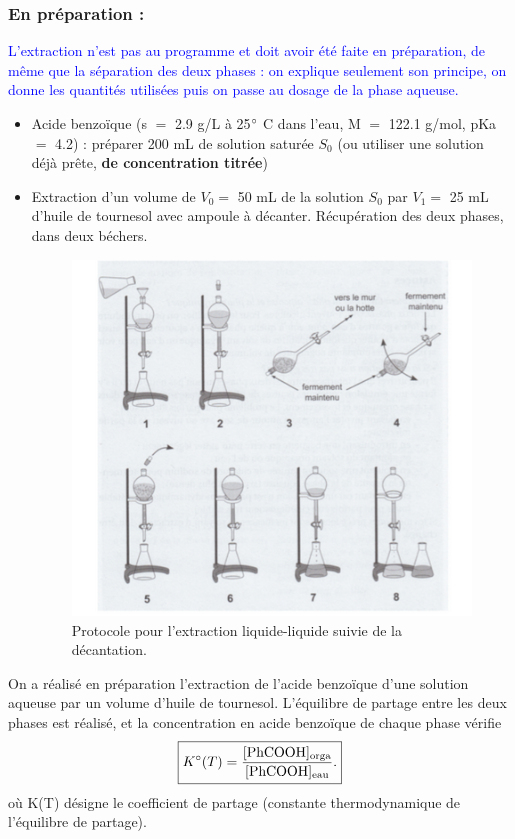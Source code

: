 \documentclass[11pt,a4paper]{report}
\begin{document}
\subsubsection{En préparation :}
\textcolor{blue}{L'extraction n'est pas au programme et doit avoir été faite en préparation, de même que la séparation des deux phases : on explique seulement son principe, on donne les quantités utilisées puis on passe au dosage de la phase aqueuse.}\\

\begin{itemize}
	\item Acide benzoïque (s $=$ 2.9 g/L à 25$\degree$ C dans l'eau, M $=$ 122.1 g/mol,
		 pKa $=$ 4.2) : préparer 200 mL de solution saturée $S_0$ (ou utiliser une solution déjà 				 prête, \textbf{de concentration titrée})
	\item Extraction d'un volume de $V_0 =$ 50 mL de la solution $S_0$ par $V_1 =$ 25 mL d'huile de 					tournesol avec ampoule à décanter. Récupération des deux phases, dans deux béchers.
	\begin{figure}[h!]
		\begin{center}
			\includegraphics[scale = 1]{ampoule.png}
		\end{center}
		\caption{Protocole pour l'extraction liquide-liquide suivie de la décantation.}
	\end{figure}
\end{itemize}

On a réalisé en préparation l'extraction de l'acide benzoïque d'une solution aqueuse par un volume d'huile de tournesol. L'équilibre de partage entre les deux phases est réalisé, et la concentration en acide benzoïque de chaque phase vérifie 
\begin{equation}
	\boxed{K\degree (T) = \frac{[\text{PhCOOH}]_\text{orga}}{[\text{PhCOOH}]_\text{eau}}.}
\end{equation}
où K\degree(T) désigne le coefficient de partage (constante thermodynamique de l'équilibre de partage).
\end{document}
